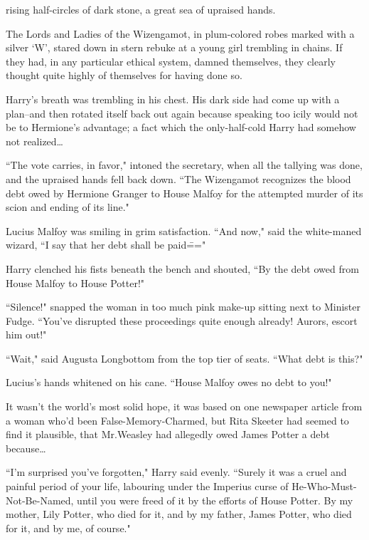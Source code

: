 
 rising half-circles of dark stone, a great sea of upraised hands.

\hplettrineextrapara
The Lords and Ladies of the Wizengamot, in plum-colored robes marked with a silver `W', stared down in stern rebuke at a young girl trembling in chains. If they had, in any particular ethical system, damned themselves, they clearly thought quite highly of themselves for having done so.

Harry's breath was trembling in his chest. His dark side had come up with a plan\---and then rotated itself back out again because speaking too icily would not be to Hermione's advantage; a fact which the only-half-cold Harry had somehow not realized{\ldots}

``The vote carries, in favor," intoned the secretary, when all the tallying was done, and the upraised hands fell back down. ``The Wizengamot recognizes the blood debt owed by Hermione Granger to House Malfoy for the attempted murder of its scion and ending of its line."

Lucius Malfoy was smiling in grim satisfaction. ``And now," said the white-maned wizard, ``I say that her debt shall be paid\==="

Harry clenched his fists beneath the bench and shouted, ``By the debt owed from House Malfoy to House Potter!"

``Silence!" snapped the woman in too much pink make-up sitting next to Minister Fudge. ``You've disrupted these proceedings quite enough already! Aurors, escort him out!"

``Wait," said Augusta Longbottom from the top tier of seats. ``What debt is this?"

Lucius's hands whitened on his cane. ``House Malfoy owes no debt to you!"

It wasn't the world's most solid hope, it was based on one newspaper article from a woman who'd been False-Memory-Charmed, but Rita Skeeter had seemed to find it plausible, that Mr.\?Weasley had allegedly owed James Potter a debt because{\ldots}

``I'm surprised you've forgotten," Harry said evenly. ``Surely it was a cruel and painful period of your life, labouring under the Imperius curse of He-Who-Must-Not-Be-Named, until you were freed of it by the efforts of House Potter. By my mother, Lily Potter, who died for it, and by my father, James Potter, who died for it, and by me, of course."


